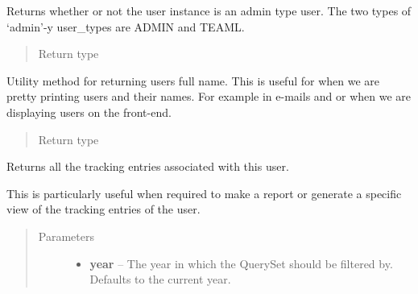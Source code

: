 \documentclass[letterpaper,10pt,english]{sphinxmanual}
\begin{document}
\begin{fulllineitems}
\begin{fulllineitems}
\end{fulllineitems}


\begin{fulllineitems}
\label{code:timetracker.tracker.models.Tbluser.is_admin}
Returns whether or not the user instance is an admin type user. The
two types of `admin'-y user\_types are ADMIN and TEAML.
\begin{quote}\begin{description}
\item[{Return type}] \leavevmode
{}

\end{description}\end{quote}

\end{fulllineitems}


\begin{fulllineitems}
\label{code:timetracker.tracker.models.Tbluser.name}
Utility method for returning users full name. This is useful for when
we are pretty printing users and their names. For example in e-mails
and or when we are displaying users on the front-end.
\begin{quote}\begin{description}
\item[{Return type}] \leavevmode
{}

\end{description}\end{quote}

\end{fulllineitems}


\begin{fulllineitems}
\label{code:timetracker.tracker.models.Tbluser.tracking_entries}
Returns all the tracking entries associated with
this user.

This is particularly useful when required to make a report or generate
a specific view of the tracking entries of the user.
\begin{quote}\begin{description}
\item[{Parameters}] \leavevmode\begin{itemize}
\item {} 
\textbf{year} -- The year in which the QuerySet should be filtered
by. Defaults to the current year.


\end{itemize}
\end{description}
\end{quote}
\end{fulllineitems}
\end{fulllineitems}
\end{document}

